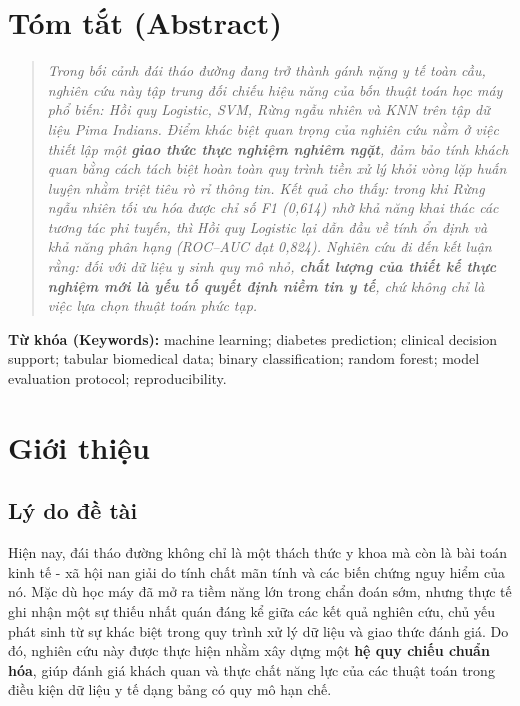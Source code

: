 \documentclass[14pt,a4paper]{extreport}
\begin{document}
\newpage
\tableofcontents
\newpage
\setcounter{page}{1}

\chapter*{Tóm tắt (Abstract)}

\begin{quote}
\itshape
\noindent
Trong bối cảnh đái tháo đường đang trở thành gánh nặng y tế toàn cầu, nghiên cứu này tập trung đối chiếu hiệu năng của bốn thuật toán học máy phổ biến: Hồi quy Logistic, SVM, Rừng ngẫu nhiên và KNN trên tập dữ liệu Pima Indians. Điểm khác biệt quan trọng của nghiên cứu nằm ở việc thiết lập một \textbf{giao thức thực nghiệm nghiêm ngặt}, đảm bảo tính khách quan bằng cách tách biệt hoàn toàn quy trình tiền xử lý khỏi vòng lặp huấn luyện nhằm triệt tiêu rò rỉ thông tin. Kết quả cho thấy: trong khi Rừng ngẫu nhiên tối ưu hóa được chỉ số F1 (0,614) nhờ khả năng khai thác các tương tác phi tuyến, thì Hồi quy Logistic lại dẫn đầu về tính ổn định và khả năng phân hạng (ROC--AUC đạt 0,824). Nghiên cứu đi đến kết luận rằng: đối với dữ liệu y sinh quy mô nhỏ, \textbf{chất lượng của thiết kế thực nghiệm mới là yếu tố quyết định niềm tin y tế}, chứ không chỉ là việc lựa chọn thuật toán phức tạp.
\end{quote}

\noindent\textbf{Từ khóa (Keywords):} machine learning; diabetes prediction; clinical decision support; tabular biomedical data; binary classification; random forest; model evaluation protocol; reproducibility.

\chapter{Giới thiệu}
\label{sec:intro}

\section{Lý do đề tài}

Hiện nay, đái tháo đường không chỉ là một thách thức y khoa mà còn là bài toán kinh tế - xã hội nan giải do tính chất mãn tính và các biến chứng nguy hiểm của nó. Mặc dù học máy đã mở ra tiềm năng lớn trong chẩn đoán sớm, nhưng thực tế ghi nhận một sự thiếu nhất quán đáng kể giữa các kết quả nghiên cứu, chủ yếu phát sinh từ sự khác biệt trong quy trình xử lý dữ liệu và giao thức đánh giá. Do đó, nghiên cứu này được thực hiện nhằm xây dựng một \textbf{hệ quy chiếu chuẩn hóa}, giúp đánh giá khách quan và thực chất năng lực của các thuật toán trong điều kiện dữ liệu y tế dạng bảng có quy mô hạn chế.
\end{document}
